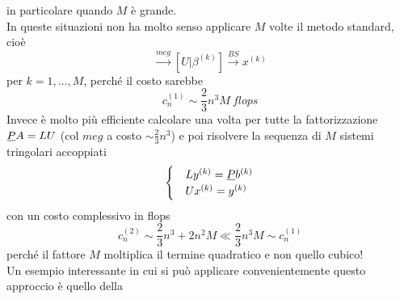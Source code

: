 \documentclass[12pt,a4paper]{article}
\begin{document}
in particolare quando $M$ è grande.\\
In queste situazioni non ha molto senso applicare $M$ volte il metodo standard, cioè
\begin{equation*}
    [A|b^{(k)}] \overset{meg}{\longrightarrow} [U|\beta^{(k)}] \overset{BS}{\longrightarrow} x^{(k)}
\end{equation*}
per $k=1,...,M$, perché il costo sarebbe
\begin{equation*}
    c_n^{(1)} \sim \frac{2}{3}n^3M \ flops
\end{equation*}
Invece è molto più efficiente calcolare una volta per tutte la fattorizzazione $\uline{P}A=LU$ (col $meg$ a costo $\sim \frac{2}{3}n^3$) e poi risolvere la sequenza di $M$ sistemi tringolari accoppiati
\begin{equation*}
    \begin{cases}
        & Ly^{(k)} = \uline{P}b^{(k)} \\
        & Ux^{(k)} = y^{(k)}
    \end{cases}
\end{equation*}
con un costo complessivo in flops
\begin{equation*}
    c_n^{(2)} \sim \frac{2}{3}n^3 + 2n^2M \ll \frac{2}{3}n^3M \sim c_n^{(1)}
\end{equation*}
perché il fattore $M$ moltiplica il termine quadratico e non quello cubico!\\
Un esempio interessante in cui si può applicare convenientemente questo approccio è quello della
\end{document}

